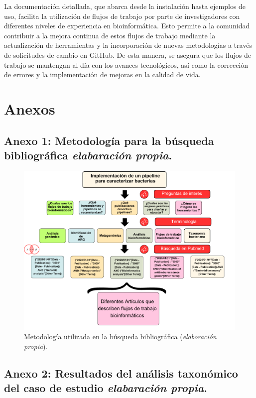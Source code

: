 \documentclass[12pt]{article}
\begin{document}
La documentación detallada, que abarca desde la instalación 
hasta ejemplos de uso, facilita la utilización de flujos de trabajo 
por parte de investigadores con diferentes niveles de experiencia en 
bioinformática. Esto permite a la comunidad contribuir a la mejora 
continua de estos flujos de trabajo mediante la actualización de 
herramientas y la incorporación de nuevas metodologías a través de 
solicitudes de cambio en GitHub. De esta manera, se asegura que los 
flujos de trabajo se mantengan al día con los avances tecnológicos, 
así como la corrección de errores y la implementación de mejoras en 
la calidad de vida.

\newpage

\clearpage 
\section{Anexos}
\subsection{Anexo 1: Metodología para la búsqueda bibliográfica \emph{elabaración propia}.}

\begin{figure}[ht!]
    \centering
    \small
    \includegraphics[scale=0.35]{anexo1.png}
    \caption{Metodología utilizada en la búsqueda bibliográfica (\emph{elaboración propia}).} 
    \label{fig:metodologiaBiblio}
\end{figure}

\newpage
\subsection{Anexo 2: Resultados del análisis taxonómico del caso de estudio \emph{elabaración propia}.}
\end{document}

